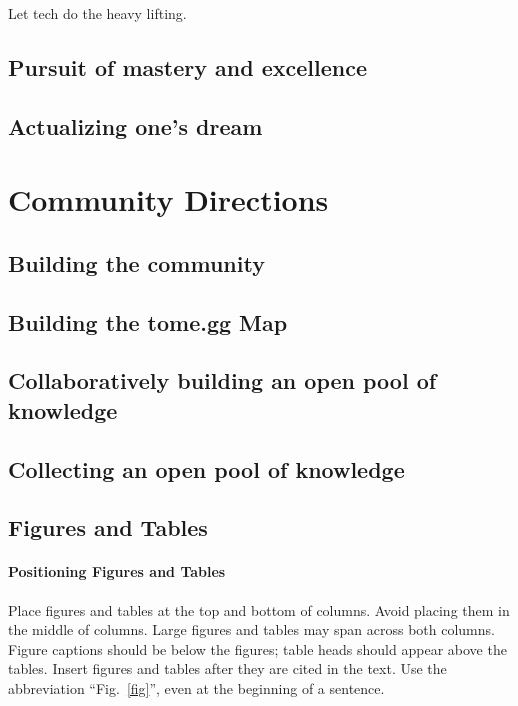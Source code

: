 \documentclass[journal, onecolumn]{IEEEtran}
\begin{document}
Let tech do the heavy lifting.

\subsection{Pursuit of mastery and excellence}

\subsection{Actualizing one's dream}


\section{Community Directions}
\label{sec:community_directions}

\subsection{Building the community}

\subsection{Building the tome.gg Map}

\subsection{Collaboratively building an open pool of knowledge}

\subsection{Collecting an open pool of knowledge}


\subsection{Figures and Tables}
\paragraph{Positioning Figures and Tables} Place figures and tables at the top and 
bottom of columns. Avoid placing them in the middle of columns. Large 
figures and tables may span across both columns. Figure captions should be 
below the figures; table heads should appear above the tables. Insert 
figures and tables after they are cited in the text. Use the abbreviation 
``Fig.~\ref{fig}'', even at the beginning of a sentence.
\end{document}
